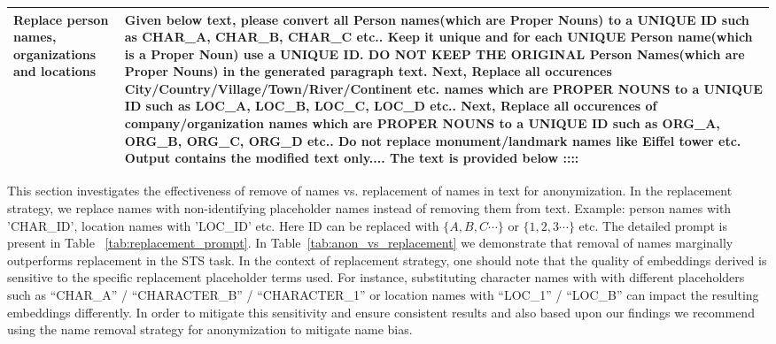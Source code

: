 \begin{table*}[h!]
\centering
\begin{tabular}{|p{5cm}|p{10cm}}
\toprule
   Replace person names, organizations and locations  &  Given below text, please convert all Person names(which are Proper Nouns) to a UNIQUE ID such as CHAR\_A, CHAR\_B, CHAR\_C etc..  Keep it unique and for each UNIQUE Person name(which is a Proper Noun) use a UNIQUE ID. DO NOT KEEP THE ORIGINAL Person Names(which are Proper Nouns) in the generated paragraph text. Next, Replace all occurences  City/Country/Village/Town/River/Continent etc. names which are PROPER NOUNS to a UNIQUE ID such as LOC\_A, LOC\_B, LOC\_C, LOC\_D etc.. Next, Replace all occurences of company/organization names which are PROPER NOUNS to a UNIQUE ID such as ORG\_A, ORG\_B, ORG\_C, ORG\_D etc..   Do not replace monument/landmark names like Eiffel tower etc. Output contains the modified text only....  The text is provided below :::: \\
   \hline
\end{tabular}
\caption{Prompt for Anonymization using replacement strategy described in Sec.~\ref{sec:anon_vs_replacement} \label{tab:replacement_prompt}}
\end{table*}

This section investigates the effectiveness of remove of names vs.  replacement of names in text for anonymization. In the replacement strategy, we replace names with non-identifying placeholder names instead of removing them from text. Example: person names with 'CHAR\_{ID}', location names with 'LOC\_{ID}' etc. Here ID can be replaced with $\{A, B, C \cdots \}$ or $\{1, 2, 3 \cdots \}$ etc. The detailed prompt is present in Table ~\ref{tab:replacement_prompt}. In Table~\ref{tab:anon_vs_replacement} we demonstrate that removal of names marginally outperforms replacement in the STS task. In the context of replacement strategy, one should note that the quality of embeddings derived is sensitive to the specific replacement placeholder terms used. For instance, substituting character names with with different placeholders such as  ``CHAR\_A'' / ``CHARACTER\_B'' / ``CHARACTER\_1'' or location names with ``LOC\_1'' / ``LOC\_B'' can impact the resulting embeddings differently. In order to mitigate this sensitivity and ensure consistent results and also based upon our findings we recommend using the name removal strategy for anonymization to mitigate name bias. 



